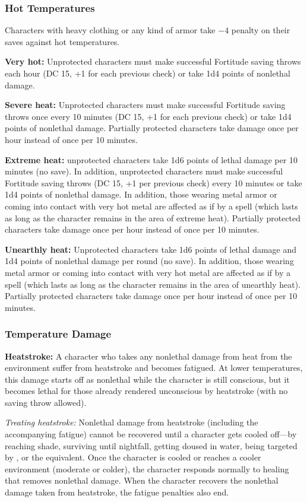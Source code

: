 \subsubsection{Hot Temperatures}
Characters with heavy clothing or any kind of armor take $-4$ penalty on their saves against hot temperatures.

\textbf{Very hot:} Unprotected characters must make successful Fortitude saving throws each hour
(DC 15, +1 for each previous check) or take 1d4 points of nonlethal damage.

\textbf{Severe heat:} Unprotected characters must make successful Fortitude saving throws once every 10 minutes (DC 15, +1 for each previous check) or take 1d4 points of nonlethal damage. Partially protected characters take damage once per hour instead of once per 10 minutes.

\textbf{Extreme heat:} unprotected characters take 1d6 points of lethal damage per 10 minutes (no save). In addition, unprotected characters must make successful Fortitude saving throws (DC 15, +1 per previous check) every 10 minutes or take 1d4 points of nonlethal damage. In addition, those wearing metal armor or coming into contact with very hot metal are affected as if by a  spell (which lasts as long as the character remains in the area of extreme heat). Partially protected characters take damage once per hour instead of once per 10 minutes.

\textbf{Unearthly heat:} Unprotected characters take 1d6 points of lethal damage and 1d4 points of nonlethal damage per round (no save). In addition, those wearing metal armor or coming into contact with very hot metal are affected as if by a  spell (which lasts as long as the character remains in the area of unearthly heat). Partially protected characters take damage once per hour instead of once per 10 minutes.

\subsubsection{Temperature Damage}
\textbf{Heatstroke:} A character who takes any nonlethal damage from heat from the environment suffer from heatstroke and becomes fatigued. At lower temperatures, this damage starts off as nonlethal while the character is still conscious, but it becomes lethal for those already rendered unconscious by heatstroke (with no saving throw allowed).

\textit{Treating heatstroke:} Nonlethal damage from heatstroke (including the accompanying fatigue) cannot be recovered until a character gets cooled off---by reaching shade, surviving until nightfall, getting doused in water, being targeted by , or the equivalent. Once the character is cooled or reaches a cooler environment (moderate or colder), the character responds normally to healing that removes nonlethal damage. When the character recovers the nonlethal damage taken from heatstroke, the fatigue penalties also end.


